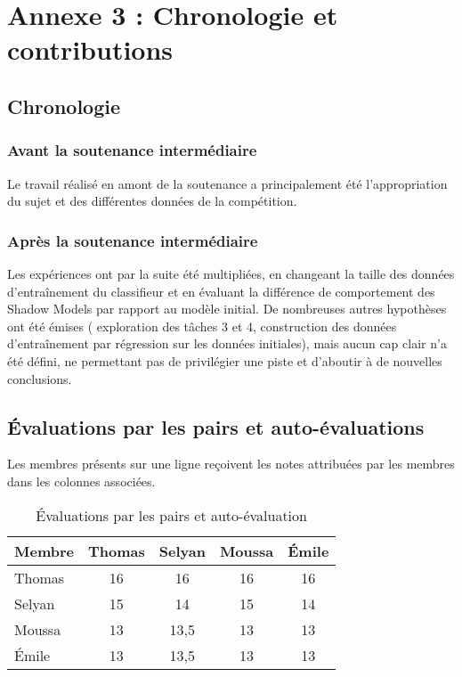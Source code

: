 \chapter*{Annexe 3 : Chronologie et contributions }
\section*{Chronologie}
    \subsection*{Avant la soutenance intermédiaire}
        Le travail réalisé en amont de la soutenance a principalement été l'appropriation du
        sujet et des différentes données de la compétition.
    \subsection*{Après la soutenance intermédiaire}
        Les expériences ont par la suite été multipliées, en changeant la taille des données
        d'entraînement du classifieur et en évaluant la différence de comportement des Shadow
        Models par rapport au modèle initial. De nombreuses autres hypothèses ont été émises (
        exploration des tâches 3 et 4, construction des données d'entraînement par régression
        sur les données initiales), mais aucun cap clair n'a été défini, ne permettant pas de
        privilégier une piste et d'aboutir à de nouvelles conclusions.
\section*{Évaluations par les pairs et auto-évaluations}
    Les membres présents sur une ligne reçoivent les notes attribuées par les membres dans les
    colonnes
    associées.
    \begin{table}[H]
        \centering
        \begin{tabular}{lcccc}
            \toprule
            \textbf{Membre} & \textbf{Thomas} & \textbf{Selyan} & \textbf{Moussa} & \textbf{Émile} \\
            \midrule
            Thomas & 16 & 16 & 16 & 16 \\
            Selyan & 15 & 14 & 15 & 14 \\
            Moussa & 13 & 13,5 & 13 & 13 \\
            Émile & 13 & 13,5 & 13 & 13 \\
            \bottomrule
        \end{tabular}
        \caption{Évaluations par les pairs et auto-évaluation}
        \label{tab:6}
    \end{table}
